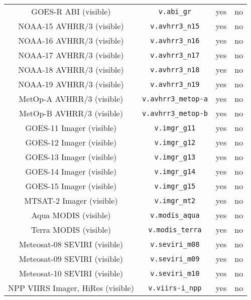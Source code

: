 \begin{center}
\begin{longtable}{c c c c}
  GOES-R ABI (visible)               & \texttt{v.abi\_gr}           &  yes     &  no        \\
  NOAA-15 AVHRR/3 (visible)          & \texttt{v.avhrr3\_n15}       &  yes     &  no        \\
  NOAA-16 AVHRR/3 (visible)          & \texttt{v.avhrr3\_n16}       &  yes     &  no        \\
  NOAA-17 AVHRR/3 (visible)          & \texttt{v.avhrr3\_n17}       &  yes     &  no        \\
  NOAA-18 AVHRR/3 (visible)          & \texttt{v.avhrr3\_n18}       &  yes     &  no        \\
  NOAA-19 AVHRR/3 (visible)          & \texttt{v.avhrr3\_n19}       &  yes     &  no        \\
  MetOp-A AVHRR/3 (visible)          & \texttt{v.avhrr3\_metop-a}   &  yes     &  no        \\
  MetOp-B AVHRR/3 (visible)          & \texttt{v.avhrr3\_metop-b}   &  yes     &  no        \\
  GOES-11 Imager (visible)           & \texttt{v.imgr\_g11}         &  yes     &  no        \\
  GOES-12 Imager (visible)           & \texttt{v.imgr\_g12}         &  yes     &  no        \\
  GOES-13 Imager (visible)           & \texttt{v.imgr\_g13}         &  yes     &  no        \\
  GOES-14 Imager (visible)           & \texttt{v.imgr\_g14}         &  yes     &  no        \\
  GOES-15 Imager (visible)           & \texttt{v.imgr\_g15}         &  yes     &  no        \\
  MTSAT-2 Imager (visible)           & \texttt{v.imgr\_mt2}         &  yes     &  no        \\
  Aqua MODIS (visible)               & \texttt{v.modis\_aqua}       &  yes     &  no        \\
  Terra MODIS (visible)              & \texttt{v.modis\_terra}      &  yes     &  no        \\
  Meteosat-08 SEVIRI (visible)       & \texttt{v.seviri\_m08}       &  yes     &  no        \\
  Meteosat-09 SEVIRI (visible)       & \texttt{v.seviri\_m09}       &  yes     &  no        \\
  Meteosat-10 SEVIRI (visible)       & \texttt{v.seviri\_m10}       &  yes     &  no        \\
  NPP VIIRS Imager, HiRes (visible)  & \texttt{v.viirs-i\_npp}      &  yes     &  no        \\

\end{longtable}
\end{center}
